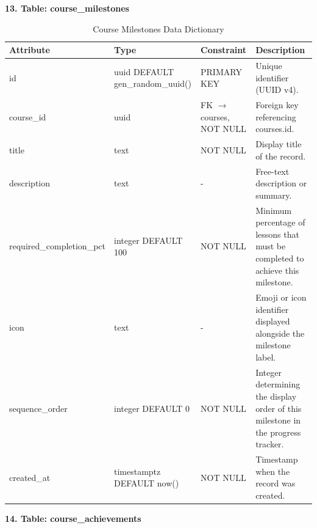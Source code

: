 \documentclass[12pt, oneside]{article} %
\newcommand{\tabbreak}{\hyphenpenalty=200\exhyphenpenalty=200\tolerance=4000\hbadness=10000\hspace{0pt}}
\begin{document}
\textbf{13. Table: course\_milestones}

\begin{table}[H]
\caption{Course Milestones Data Dictionary}
\label{tab:dd_course_milestones}
\vspace{-4mm}
\begin{center}
\renewcommand{\arraystretch}{1.15}
\scriptsize
\begin{tabular}{|>{\raggedright\arraybackslash\tabbreak}p{2.67cm}|>{\raggedright\arraybackslash\tabbreak}p{2.93cm}|>{\raggedright\arraybackslash\tabbreak}p{2.67cm}|>{\raggedright\arraybackslash\tabbreak}p{4.51cm}|}
\hline
\textbf{Attribute} & \textbf{Type} & \textbf{Constraint} & \textbf{Description} \\ \hline
id & uuid DEFAULT gen\_random\_uuid() & PRIMARY KEY & Unique identifier (UUID v4). \\ \hline
course\_id & uuid & FK $\rightarrow$ courses, NOT NULL & Foreign key referencing courses.id. \\ \hline
title & text & NOT NULL & Display title of the record. \\ \hline
description & text & - & Free-text description or summary. \\ \hline
required\_completion\_pct & integer DEFAULT 100 & NOT NULL & Minimum percentage of lessons that must be completed to achieve this milestone. \\ \hline
icon & text & - & Emoji or icon identifier displayed alongside the milestone label. \\ \hline
sequence\_order & integer DEFAULT 0 & NOT NULL & Integer determining the display order of this milestone in the progress tracker. \\ \hline
created\_at & timestamptz DEFAULT now() & NOT NULL & Timestamp when the record was created. \\ \hline
\end{tabular}
\end{center}
\end{table}

\textbf{14. Table: course\_achievements}
\end{document}
